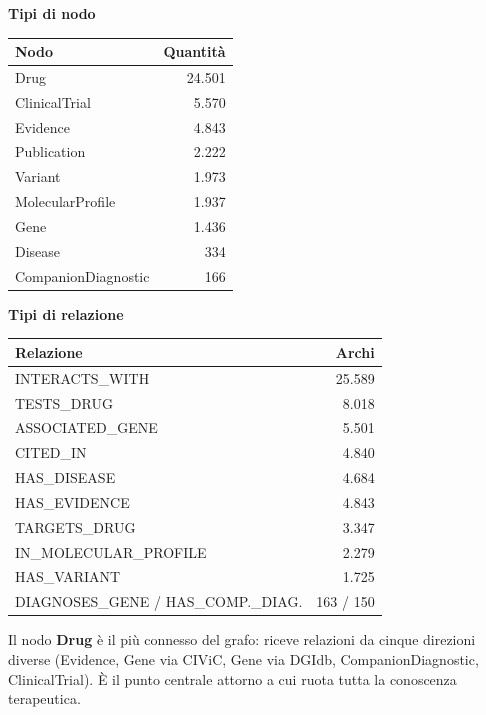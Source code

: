 \documentclass[11pt,a4paper]{article}
\begin{document}
\begin{center}
\small
\begin{minipage}[t]{0.49\textwidth}
\centering\sffamily\bfseries\color{primary}\small Tipi di nodo\\[3pt]
\begin{tabular}{@{}lr@{}}
\toprule
Nodo & Quantit\`a \\
\midrule
Drug & 24.501 \\
ClinicalTrial & 5.570 \\
Evidence & 4.843 \\
Publication & 2.222 \\
Variant & 1.973 \\
MolecularProfile & 1.937 \\
Gene & 1.436 \\
Disease & 334 \\
CompanionDiagnostic & 166 \\
\bottomrule
\end{tabular}
\end{minipage}\hfill
\begin{minipage}[t]{0.49\textwidth}
\centering\sffamily\bfseries\color{primary}\small Tipi di relazione\\[3pt]
\begin{tabular}{@{}lr@{}}
\toprule
Relazione & Archi \\
\midrule
INTERACTS\_WITH & 25.589 \\
TESTS\_DRUG & 8.018 \\
ASSOCIATED\_GENE & 5.501 \\
CITED\_IN & 4.840 \\
HAS\_DISEASE & 4.684 \\
HAS\_EVIDENCE & 4.843 \\
TARGETS\_DRUG & 3.347 \\
IN\_MOLECULAR\_PROFILE & 2.279 \\
HAS\_VARIANT & 1.725 \\
DIAGNOSES\_GENE / HAS\_COMP.\_DIAG. & 163 / 150 \\
\bottomrule
\end{tabular}
\end{minipage}
\end{center}

\vspace{4pt}
Il nodo \textbf{Drug} \`e il pi\`u connesso del grafo: riceve relazioni da cinque direzioni diverse (Evidence, Gene via CIViC, Gene via DGIdb, CompanionDiagnostic, ClinicalTrial). \`E il punto centrale attorno a cui ruota tutta la conoscenza terapeutica.
\end{document}
